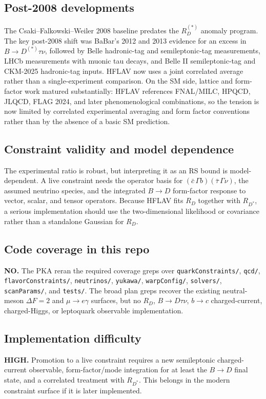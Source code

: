 \subsection*{Post-2008 developments}
The Csaki--Falkowski--Weiler 2008 baseline predates the \(R_D^{(*)}\) anomaly
program.  The key post-2008 shift was BaBar's 2012 and 2013 evidence for an
excess in \(B\to D^{(*)}\tau\nu\), followed by Belle hadronic-tag and
semileptonic-tag measurements, LHCb measurements with muonic tau decays, and
Belle II semileptonic-tag and CKM-2025 hadronic-tag inputs.  HFLAV now uses a
joint correlated average rather than a single-experiment comparison.  On the
SM side, lattice and form-factor work matured substantially: HFLAV references
FNAL/MILC, HPQCD, JLQCD, FLAG 2024, and later phenomenological combinations,
so the tension is now limited by correlated experimental averaging and form
factor conventions rather than by the absence of a basic SM prediction.

\subsection*{Constraint validity and model dependence}
The experimental ratio is robust, but interpreting it as an RS bound is
model-dependent.  A live constraint needs the operator basis for
\((\bar c\,\Gamma b)(\bar\tau\,\Gamma\nu)\), the assumed neutrino species, and
the integrated \(B\to D\) form-factor response to vector, scalar, and tensor
operators.  Because HFLAV fits \(R_D\) together with \(R_{D^*}\), a serious
implementation should use the two-dimensional likelihood or covariance rather
than a standalone Gaussian for \(R_D\).

\subsection*{Code coverage in this repo}
\textbf{NO.}  The PKA reran the required coverage greps over
\texttt{quarkConstraints/}, \texttt{qcd/}, \texttt{flavorConstraints/},
\texttt{neutrinos/}, \texttt{yukawa/}, \texttt{warpConfig/},
\texttt{solvers/}, \texttt{scanParams/}, and \texttt{tests/}.  The broad plan
greps recover the existing neutral-meson \(\Delta F=2\) and
\(\mu\to e\gamma\) surfaces, but no \(R_D\), \(B\to D\tau\nu\), \(b\to c\)
charged-current, charged-Higgs, or leptoquark observable implementation.

\subsection*{Implementation difficulty}
\textbf{HIGH.}  Promotion to a live constraint requires a new semileptonic
charged-current observable, form-factor/mode integration for at least the
\(B\to D\) final state, and a correlated treatment with \(R_{D^*}\).  This
belongs in the modern constraint surface if it is later implemented.

